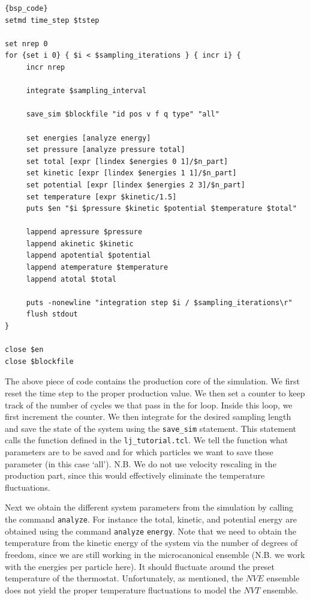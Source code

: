 \documentclass[
paper=a4,                       %
fontsize=11pt,                  %
twoside,                        %
footsepline,                    %
headsepline,                    %
headinclude=false,              %
footinclude=false,              %
pagesize,                       %
]{scrartcl}
\begin{document}
{\small\vspace{0,2cm}
\begin{lstlisting}[firstnumber=auto]{bsp_code}
setmd time_step $tstep

set nrep 0
for {set i 0} { $i < $sampling_iterations } { incr i} {
     incr nrep 

     integrate $sampling_interval

     save_sim $blockfile "id pos v f q type" "all"

     set energies [analyze energy]
     set pressure [analyze pressure total]
     set total [expr [lindex $energies 0 1]/$n_part]
     set kinetic [expr [lindex $energies 1 1]/$n_part]
     set potential [expr [lindex $energies 2 3]/$n_part]
     set temperature [expr $kinetic/1.5]
     puts $en "$i $pressure $kinetic $potential $temperature $total"

     lappend apressure $pressure
     lappend akinetic $kinetic
     lappend apotential $potential
     lappend atemperature $temperature
     lappend atotal $total

     puts -nonewline "integration step $i / $sampling_iterations\r"
     flush stdout
}

close $en
close $blockfile
\end{lstlisting}\vspace{0,2cm}
}

\noindent The above piece of code contains the production core of the simulation. We first reset the time step to the proper production value. We then set a counter to keep track of the number of cycles we that pass in the for loop. Inside this loop, we first increment the counter. We then integrate for the desired sampling length and save the state of the system using the  \lstinline|save_sim| statement. This statement calls the function defined in the \texttt{lj\_tutorial.tcl}. We tell the function what parameters are to be saved and for which particles we want to save these parameter (in this case `all'). N.B. We do not use velocity rescaling in the production part, since this would effectively eliminate the temperature fluctuations. 

Next we obtain the different system parameters from the simulation by calling the command \lstinline|analyze|. For instance the total, kinetic, and potential energy are obtained using the command \lstinline|analyze| \texttt{energy}. Note that we need to obtain the temperature from the kinetic energy of the system via the number of degrees of freedom, since we are still working in the microcanonical ensemble (N.B. we work with the energies per particle here). It should fluctuate around the preset temperature of the thermostat. Unfortunately, as mentioned, the $NVE$ ensemble does not yield the proper temperature fluctuations to model the $NVT$ ensemble.
\end{document}
